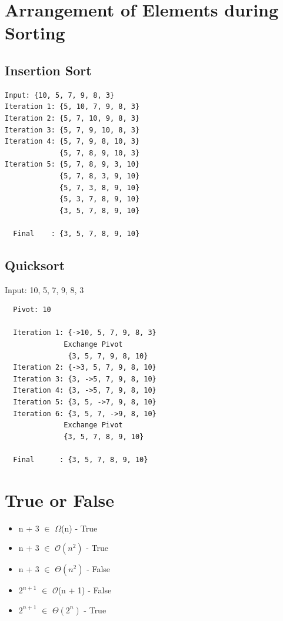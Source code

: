 \documentclass{article}
\begin{document}
\section{Arrangement of Elements during Sorting}
\subsection{Insertion Sort}
\begin{verbatim}
Input: {10, 5, 7, 9, 8, 3}
Iteration 1: {5, 10, 7, 9, 8, 3}
Iteration 2: {5, 7, 10, 9, 8, 3}
Iteration 3: {5, 7, 9, 10, 8, 3}
Iteration 4: {5, 7, 9, 8, 10, 3}
             {5, 7, 8, 9, 10, 3}
Iteration 5: {5, 7, 8, 9, 3, 10}
             {5, 7, 8, 3, 9, 10}
             {5, 7, 3, 8, 9, 10}
             {5, 3, 7, 8, 9, 10}
             {3, 5, 7, 8, 9, 10}
             
  Final    : {3, 5, 7, 8, 9, 10}             
\end{verbatim}

\subsection{Quicksort}
Input: {10, 5, 7, 9, 8, 3} \\
\begin{verbatim}
  Pivot: 10
  
  Iteration 1: {->10, 5, 7, 9, 8, 3}
              Exchange Pivot
               {3, 5, 7, 9, 8, 10}
  Iteration 2: {->3, 5, 7, 9, 8, 10}
  Iteration 3: {3, ->5, 7, 9, 8, 10}
  Iteration 4: {3, ->5, 7, 9, 8, 10}
  Iteration 5: {3, 5, ->7, 9, 8, 10}
  Iteration 6: {3, 5, 7, ->9, 8, 10}
              Exchange Pivot
              {3, 5, 7, 8, 9, 10}
              
  Final      : {3, 5, 7, 8, 9, 10}
\end{verbatim}

\section{True or False}

\begin{itemize}
\item n + 3 $\in$ $\Omega$(n) - True

\item n + 3 $\in$ $\mathcal{O}(n^{2})$ - True

\item n + 3 $\in$ $\Theta(n^{2})$ - False

\item $2^{n+1}$ $\in$ $\mathcal{O}$(n + 1) - False

\item $2^{n+1}$ $\in$ $\Theta(2^{n})$ - True

\end{itemize}
\end{document}
